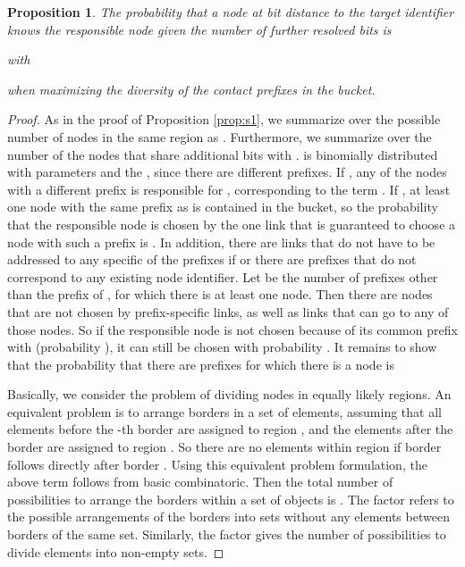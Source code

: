 \documentclass[10pt, conference, compsocconf, letterpaper]{IEEEtran}
\newtheorem{proposition}{Proposition}
\begin{document}
\vspace{3pt}
\begin{proposition} \label{prop:s2}
The probability that a node  at bit distance  to the target identifier  knows the responsible
node given the number of further resolved bits  is
 
with

when maximizing the diversity of the contact prefixes in the bucket.
\end{proposition}
\begin{proof}
As in the proof of Proposition \ref{prop:s1}, we summarize over the possible number
of nodes  in the same region as . Furthermore, we summarize over the number  of the  nodes that share additional 
 bits with .  is binomially distributed with parameters  and the
, since there are  different prefixes. 
If , any of the  nodes with a different prefix is responsible for , corresponding
 to the term .
If , at least one node with the same prefix as  is contained in the bucket, so the
probability that the responsible node is chosen by the one link that is guaranteed to choose
a node with such a prefix  is .
In addition, there are links that do not have to be addressed to any specific of the  
prefixes if  or there are prefixes that do not correspond to any existing node identifier. 
Let  be the number of prefixes other than the prefix of , for which there is at least one node.
Then there are  nodes that are not chosen by prefix-specific links, as well as 
 links that can go to any of those nodes. So if the responsible node is not chosen
because of its common prefix with  (probability ), it can still be chosen with
probability  .
It remains to show that the probability that there are  prefixes for which there is a node
is 

Basically, we consider the problem of dividing  nodes in  equally likely regions.
An equivalent problem is to arrange  borders in a set of  elements, assuming
that all elements before the -th border are assigned to region , and the elements
after the border  are assigned to region .
So there are no elements within region  if border  follows directly after border .
Using this equivalent problem formulation, the above term follows from basic
combinatoric. 
Then the total number of possibilities to arrange the  borders within a set of 
 objects is .
The factor  refers to the possible arrangements of the borders
into  sets without any elements between borders of the same set.
Similarly, the factor  gives the number of
possibilities to divide  elements into  non-empty sets.\end{proof}
\end{document}
